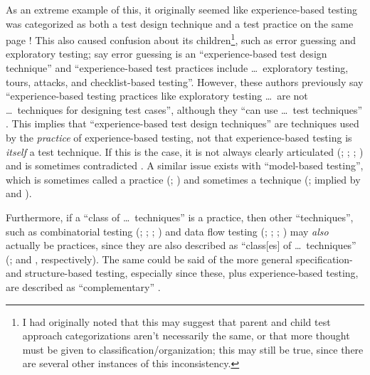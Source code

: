 As an extreme example of this, it originally
seemed like experience-based testing was categorized as both a test design
technique and a test practice on the same page \citep[p.~22]{IEEE2022}! This
also caused confusion about its children\footnote{I had originally noted that
      this may suggest that parent and child test approach categorizations
      aren't necessarily the same, or that more thought must be given to
      classification/organization; this may still be true, since there are
      several other instances of this inconsistency.}, such as error guessing
and exploratory testing; \citeyearpar[p.~34]{IEEE2022} say error guessing is an
``experience-based test design technique'' and ``experience-based test
practices include \dots\ exploratory testing, tours, attacks, and
checklist-based testing''. However, these authors previously say
``experience-based testing practices like exploratory testing \dots\ are not
\dots\ techniques for designing test cases'', although they ``can use \dots\
test techniques'' \citeyearpar[p.~viii]{IEEE2021}. This implies that
``experience-based test design techniques'' are techniques used by the
\emph{practice} of experience-based testing, not that experience-based testing
is \emph{itself} a test technique. If this is the case, it is not always clearly
articulated (\citealp[pp.~4,~22]{IEEE2022}; \citeyear[p.~4]{IEEE2021};
\citealp[p.~5-13]{SWEBOK2024}; \citetalias{ISTQB}) and is sometimes contradicted
\citep[p.~46]{Firesmith2015}. A similar issue exists with ``model-based
testing'', which is sometimes called a practice (\citealp[p.~22]{IEEE2022};
\citeyear[p.~viii]{IEEE2021}) and sometimes a technique (\citealp[p.~4]{Kam2008};
implied by \citealp[p.~7]{IEEE2021} and \citeyear[p.~469]{IEEE2017}).

Furthermore, if a ``class of \dots\ techniques''
is a practice, then other ``techniques'', such as combinatorial testing
(\citealp[pp.~3,~22]{IEEE2022}; \citeyear[p.~2]{IEEE2021};
\citealp[p.~5-11]{SWEBOK2024}; ) and data flow testing
(\citealp[p.~22]{IEEE2022}; \citeyear[p.~3]{IEEE2021};
\citealp[p.~5-13]{SWEBOK2024}; \citealp[p.~43]{Kam2008}) may \emph{also}
actually be practices, since they are also described as ``class[es] of \dots\
techniques'' (\citealp[p.~3]{IEEE2022}; \citeyear[p.~2]{IEEE2021} and
\citeyear[p.~3]{IEEE2021}, respectively). The same could be said of the more
general specification- and structure-based testing, especially since these,
plus experience-based testing, are described as ``complementary''
\citeyearpar[p.~8, Fig.~2]{IEEE2021}.

